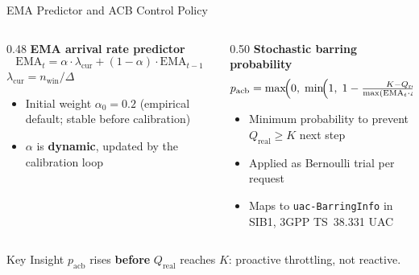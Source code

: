 \documentclass[aspectratio=169,t]{beamer}
\newcommand{\qreal}{Q_{\mathrm{real}}}
\newcommand{\pacb}{p_{\mathrm{acb}}}
\newcommand{\ema}{\mathrm{EMA}}
\begin{document}
\begin{frame}{EMA Predictor and ACB Control Policy}

  \begin{columns}[T]
    \begin{column}{0.48\textwidth}
      \textbf{EMA arrival rate predictor}
      \[
        \ema_t = \alpha \cdot \lambda_{\mathrm{cur}}
               + (1-\alpha) \cdot \ema_{t-1}
      \]
      {\small $\lambda_{\mathrm{cur}} = n_{\mathrm{win}} / \Delta$}

      \vspace{6pt}
      {\small
      \begin{itemize}\setlength\itemsep{3pt}
        \item Initial weight $\alpha_0 = 0.2$ (empirical default; stable before calibration)
        \item $\alpha$ is \textbf{dynamic}, updated by the calibration loop
      \end{itemize}}
    \end{column}

    \begin{column}{0.50\textwidth}
      \textbf{Stochastic barring probability}
      \[
        \pacb = \max\!\Bigl(0,\;\min\!\Bigl(1,\;
          1 - \tfrac{K - \qreal}{\max(\ema_t\cdot\Delta,\,10^{-9})}
        \Bigr)\Bigr)
      \]

      \vspace{4pt}
      {\small
      \begin{itemize}\setlength\itemsep{3pt}
        \item Minimum probability to prevent $\qreal \geq K$ next step
        \item Applied as Bernoulli trial per request
        \item Maps to \texttt{uac-BarringInfo} in SIB1, 3GPP TS~38.331 UAC
      \end{itemize}}
    \end{column}
  \end{columns}

  \vspace{8pt}
  \begin{exampleblock}{\small Key Insight}
    \small
    $\pacb$ rises \textbf{before} $\qreal$ reaches $K$: proactive throttling, not reactive.
  \end{exampleblock}

\end{frame}
\end{document}
